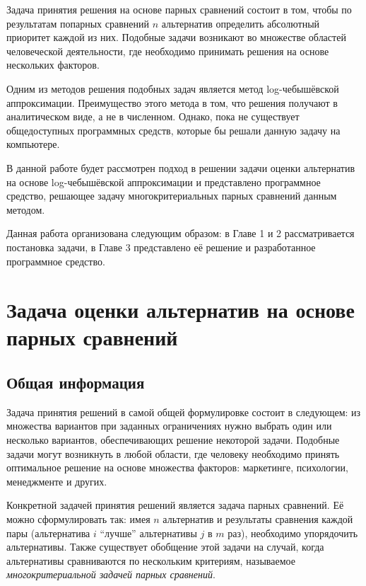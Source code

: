 \documentclass[specialist,
	substylefile = spbu.rtx,
	subf,href,colorlinks=true, 12pt]{disser}
\begin{document}


\maketitle

\maketitle[en]
\tableofcontents
\intro

Задача принятия решения на основе парных сравнений состоит в том, чтобы по результатам попарных сравнений $n$ альтернатив определить абсолютный приоритет каждой из них. Подобные задачи возникают во множестве областей человеческой деятельности, где необходимо принимать решения на основе нескольких факторов.

Одним из методов решения подобных задач является метод log-чебышёвской аппроксимации. Преимущество этого метода в том, что решения получают в аналитическом виде, а не в численном. Однако, пока не существует общедоступных программных средств, которые бы решали данную задачу на компьютере.

В данной работе будет рассмотрен подход \cite{krivulin2019} в решении задачи оценки альтернатив на основе log-чебышёвской аппроксимации и представлено программное средство, решающее задачу многокритериальных парных сравнений данным методом.

Данная работа организована следующим образом: в Главе 1 и 2 рассматривается постановка задачи, в Главе 3 представлено её решение и разработанное программное средство.

\chapter{Задача оценки альтернатив на основе парных сравнений}
\section{Общая информация}
Задача принятия решений в самой общей формулировке состоит в следующем: из множества вариантов при заданных ограничениях нужно выбрать один или несколько вариантов, обеспечивающих решение некоторой задачи. 
Подобные задачи могут возникнуть в любой области, где человеку необходимо принять оптимальное решение на основе множества факторов: маркетинге, психологии, менеджменте и других.

Конкретной задачей принятия решений является задача парных сравнений. Её можно сформулировать так: имея $n$ альтернатив и результаты сравнения каждой пары (альтернатива $i$ \enquote{лучше} альтернативы $j$ в $m$ раз), необходимо упорядочить альтернативы. Также существует обобщение этой задачи на случай, когда альтернативы сравниваются по нескольким критериям, называемое \textit{многокритериальной задачей парных сравнений}.
\end{document}
